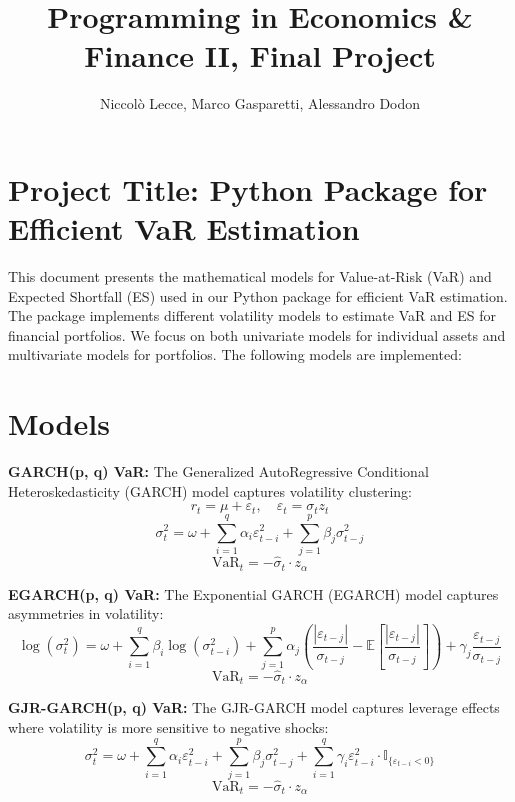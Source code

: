 \documentclass[12pt]{article}
\title{\textbf{\huge Programming in Economics \& Finance II, Final Project}}
\author{Niccolò Lecce, Marco Gasparetti, Alessandro Dodon}
\date{}
\begin{document}
\maketitle

\section*{Project Title: Python Package for Efficient VaR Estimation}

This document presents the mathematical models for Value-at-Risk (VaR) and Expected Shortfall (ES) used in our Python package for efficient VaR estimation. The package implements different volatility models to estimate VaR and ES for financial portfolios. We focus on both univariate models for individual assets and multivariate models for portfolios. The following models are implemented:

\section*{Models}

\vspace{0.5cm} %

\textbf{GARCH(p, q) VaR:}  
The Generalized AutoRegressive Conditional Heteroskedasticity (GARCH) model captures volatility clustering:
\[
r_t = \mu + \varepsilon_t, \quad \varepsilon_t = \sigma_t z_t
\]
\[
\sigma_t^2 = \omega + \sum_{i=1}^q \alpha_i \varepsilon_{t-i}^2 + \sum_{j=1}^p \beta_j \sigma_{t-j}^2
\]
\[
\text{VaR}_t = -\hat{\sigma}_t \cdot z_\alpha
\]

\vspace{0.5cm} %

\textbf{EGARCH(p, q) VaR:}  
The Exponential GARCH (EGARCH) model captures asymmetries in volatility:
\[
\log(\sigma_t^2) = \omega + \sum_{i=1}^q \beta_i \log(\sigma_{t-i}^2) + \sum_{j=1}^p \alpha_j \left( \frac{|\varepsilon_{t-j}|}{\sigma_{t-j}} - \mathbb{E}\left[ \frac{|\varepsilon_{t-j}|}{\sigma_{t-j}} \right] \right) + \gamma_j \frac{\varepsilon_{t-j}}{\sigma_{t-j}}
\]
\[
\text{VaR}_t = -\hat{\sigma}_t \cdot z_\alpha
\]

\vspace{0.5cm}

\textbf{GJR-GARCH(p, q) VaR:}  
The GJR-GARCH model captures leverage effects where volatility is more sensitive to negative shocks:
\[
\sigma_t^2 = \omega + \sum_{i=1}^q \alpha_i \varepsilon_{t-i}^2 + \sum_{j=1}^p \beta_j \sigma_{t-j}^2 + \sum_{i=1}^q \gamma_i \varepsilon_{t-i}^2 \cdot \mathbb{I}_{\{\varepsilon_{t-i}<0\}}
\]
\[
\text{VaR}_t = -\hat{\sigma}_t \cdot z_\alpha
\]
\end{document}
